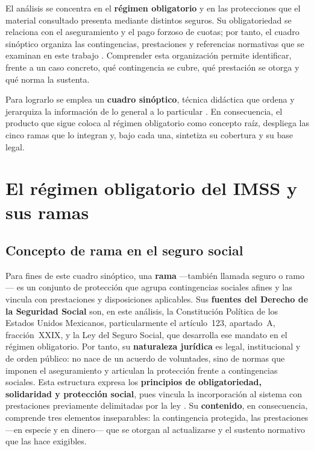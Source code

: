 \documentclass[12pt,letterpaper,oneside]{article}
\begin{document}
El an\'alisis se concentra en el \textbf{r\'egimen obligatorio} y en las protecciones que el material consultado presenta mediante distintos seguros. Su obligatoriedad se relaciona con el aseguramiento y el pago forzoso de cuotas; por tanto, el cuadro sin\'optico organiza las contingencias, prestaciones y referencias normativas que se examinan en este trabajo \citep{lss2026,ramirezChavero2009}. Comprender esta organizaci\'on permite identificar, frente a un caso concreto, qu\'e contingencia se cubre, qu\'e prestaci\'on se otorga y qu\'e norma la sustenta.

Para lograrlo se emplea un \textbf{cuadro sin\'optico}, t\'ecnica did\'actica que ordena y jerarquiza la informaci\'on de lo general a lo particular \citep{bricenoRuiz2011}. En consecuencia, el producto que sigue coloca al r\'egimen obligatorio como concepto ra\'iz, despliega las cinco ramas que lo integran y, bajo cada una, sintetiza su cobertura y su base legal.

\section{El r\'egimen obligatorio del IMSS y sus ramas}

\subsection{Concepto de rama en el seguro social}

Para fines de este cuadro sin\'optico, una \textbf{rama} ---tambi\'en llamada seguro o ramo--- es un conjunto de protecci\'on que agrupa contingencias sociales afines y las vincula con prestaciones y disposiciones aplicables. Sus \textbf{fuentes del Derecho de la Seguridad Social} son, en este an\'alisis, la Constituci\'on Pol\'itica de los Estados Unidos Mexicanos, particularmente el art\'iculo~123, apartado~A, fracci\'on~XXIX, y la Ley del Seguro Social, que desarrolla ese mandato en el r\'egimen obligatorio. Por tanto, su \textbf{naturaleza jur\'idica} es legal, institucional y de orden p\'ublico: no nace de un acuerdo de voluntades, sino de normas que imponen el aseguramiento y articulan la protecci\'on frente a contingencias sociales. Esta estructura expresa los \textbf{principios de obligatoriedad, solidaridad y protecci\'on social}, pues vincula la incorporaci\'on al sistema con prestaciones previamente delimitadas por la ley \citep{lss2026,bricenoRuiz2011,ramirezChavero2009}. Su \textbf{contenido}, en consecuencia, comprende tres elementos inseparables: la contingencia protegida, las prestaciones ---en especie y en dinero--- que se otorgan al actualizarse y el sustento normativo que las hace exigibles.
\end{document}
